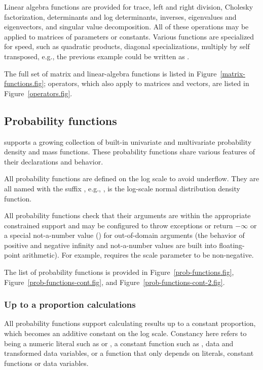 \documentclass[article]{jss}
\begin{document}
Linear algebra functions are provided for trace, left and right
division, Cholesky factorization, determinants and log determinants,
inverses, eigenvalues and eigenvectors, and singular value
decomposition.  All of these operations may be applied to matrices of
parameters or constants.  Various functions are specialized for speed,
such as quadratic products, diagonal specializations, multiply by self
transposed, e.g., the previous example could be written as
.

The full set of matrix and linear-algebra functions is listed in
Figure~\ref{matrix-functions.fig}; operators, which also apply to
matrices and vectors, are listed in Figure~\ref{operators.fig}.

\subsection{Probability functions}

 supports a growing collection of built-in univariate and
multivariate probability density and mass functions.  These
probability functions share various features of their declarations and
behavior.

All probability functions are defined on the log scale to avoid
underflow.  They are all named with the suffix , e.g.,
, is the log-scale normal distribution density
function.

All probability functions check that their arguments are within the
appropriate constrained support and may be configured to throw
exceptions or return $-\infty$ or a special not-a-number value
() for out-of-domain arguments (the behavior of positive and
negative infinity and not-a-number values are built into
floating-point arithmetic).  For example,
   requires the scale parameter
 to be non-negative.

The list of probability functions is provided in
Figure~\ref{prob-functions.fig}, 
Figure~\ref{prob-functions-cont.fig}, and
Figure~\ref{prob-functions-cont-2.fig}. 

\subsubsection{Up to a proportion calculations}

All probability functions support calculating results up to a constant
proportion, which becomes an additive constant on the log scale.
Constancy here refers to being a numeric literal such as  or
, a constant function such as , data and
transformed data variables, or a function that only depends on
literals, constant functions or data variables.
\end{document}
